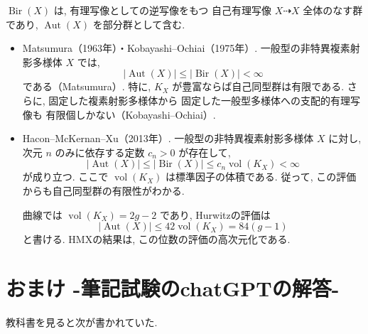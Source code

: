 \documentclass[dvipdfmx,a4paper,11pt]{article} %
\theoremstyle{definition}
\numberwithin{equation}{section}
\begin{document}
$\operatorname{Bir}(X)$ は, 有理写像としての逆写像をもつ
自己有理写像 $X\dashrightarrow X$ 全体のなす群であり,
$\operatorname{Aut}(X)$ を部分群として含む.

\begin{itemize}
\item

Matsumura（1963年）・Kobayashi--Ochiai（1975年）.
一般型の非特異複素射影多様体 $X$ では,
\[
|\operatorname{Aut}(X)|
\leq|\operatorname{Bir}(X)|<\infty
\]
である（Matsumura）.
特に, $K_X$ が豊富ならば自己同型群は有限である.
さらに, 固定した複素射影多様体から
固定した一般型多様体への支配的有理写像も
有限個しかない（Kobayashi--Ochiai）.

\item

Hacon--McKernan--Xu（2013年）.
一般型の非特異複素射影多様体 $X$ に対し,
次元 $n$ のみに依存する定数 $c_n>0$ が存在して,
\[
|\operatorname{Aut}(X)|
\leq|\operatorname{Bir}(X)|
\leq c_n\operatorname{vol}(K_X)<\infty
\]
が成り立つ.
ここで $\operatorname{vol}(K_X)$ は標準因子の体積である.
従って, この評価からも自己同型群の有限性がわかる.

曲線では $\operatorname{vol}(K_X)=2g-2$ であり,
Hurwitzの評価は
\[
|\operatorname{Aut}(X)|
\leq42\operatorname{vol}(K_X)=84(g-1)
\]
と書ける.
HMXの結果は, この位数の評価の高次元化である.
\end{itemize}




\newpage
\renewcommand{\thesection}{\Alph{section}}
\renewcommand{\theHsection}{appendix.\Alph{section}}
\setcounter{section}{0}

\section{おまけ -筆記試験のchatGPTの解答-}
\label{sec-test}
教科書を見ると次が書かれていた.
\end{document}
